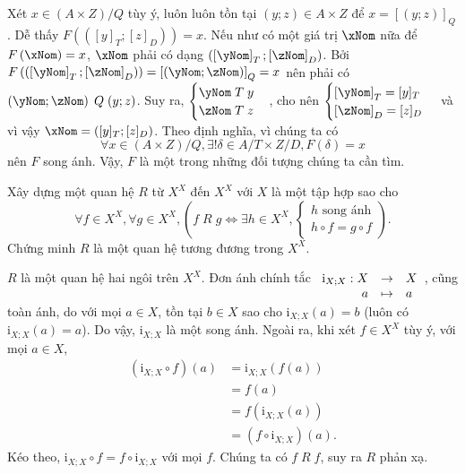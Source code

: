 Xét $x \in (A \times Z)/Q$ tùy ý, luôn luôn tồn tại $(y; z) \in A \times Z$ để $x = [(y; z)]_Q$. Dễ thấy $F(([y]_T; [z]_D)) = x$. Nếu như có một giá trị $\xNom$ nữa để $F\left(\xNom\right) = x$, $\xNom$ phải có dạng $\left(\left[\yNom\right]_T; \left[\zNom\right]_D\right)$. Bởi $F\left(\left(\left[\yNom\right]_T; \left[\zNom\right]_D\right)\right) = \left[\left(\yNom; \zNom\right)\right]_Q = x$ nên phải có $\left(\yNom; \zNom\right)\;Q\;(y; z)$. Suy ra, $\begin{cases}
   \yNom\;T\;y \\
   \zNom\;T\;z
\end{cases}$, cho nên $\begin{cases}
   \left[\yNom\right]_T = [y]_T \\
   \left[\zNom\right]_D = [z]_D
\end{cases}$ và vì vậy $\xNom = ([y]_T; [z]_D)$. Theo định nghĩa, vì chúng ta có \begin{equation*}
   \forall x \in (A \times Z)/Q, \exists ! \delta \in A/T \times Z/D, F(\delta) = x
\end{equation*}
nên $F$ song ánh. Vậy, $F$ là một trong những đối tượng chúng ta cần tìm.

\exercise Xây dựng một quan hệ $R$ từ $X^X$ đến $X^X$ với $X$ là một tập hợp sao cho \begin{equation*}
   \forall f \in X^X, \forall g \in X^X, \left(f\;R\;g\iff \exists h \in X^X, \begin{cases}
      h\text{~song ánh} \\
      h \circ f = g \circ f
   \end{cases}\right).
\end{equation*}
Chứng minh $R$ là một quan hệ tương đương trong $X^X$.

\solution

$R$ là một quan hệ hai ngôi trên $X^X$. Đơn ánh chính tắc $\begin{array}[t]{rcl}
   \mathrm{i}_{X;X}: X & \to & X \\
         a & \mapsto & a
\end{array}$, cũng toàn ánh, do với mọi $a \in X$, tồn tại $b \in X$ sao cho $\mathrm{i}_{X;X}(a) = b$ (luôn có $\mathrm{i}_{X;X}(a) = a$). Do vậy, $\mathrm{i}_{X;X}$ là một song ánh.
Ngoài ra, khi xét $f \in X^X$ tùy ý, với mọi $a \in X$, \begin{align*}
   (\mathrm{i}_{X;X} \circ f)(a) &= \mathrm{i}_{X;X}(f(a)) \\
   &= f(a) \\
   &= f(\mathrm{i}_{X;X}(a)) \\
   &= (f \circ \mathrm{i}_{X;X})(a).
\end{align*} Kéo theo, $\mathrm{i}_{X;X} \circ f = f \circ \mathrm{i}_{X;X}$ với mọi $f$. Chúng ta có $f\;R\;f$, suy ra $R$ phản xạ.

